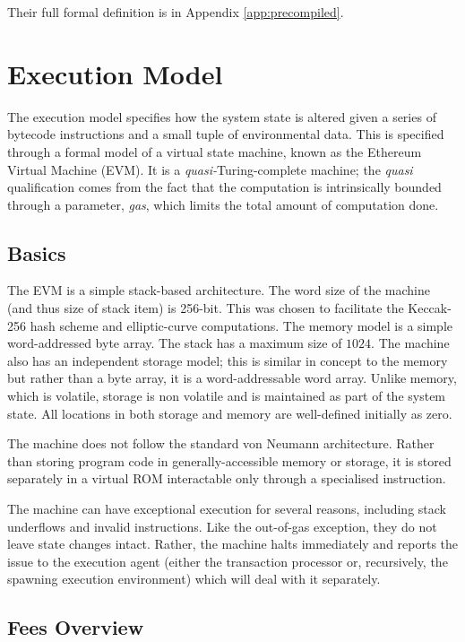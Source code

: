 \documentclass[9pt,oneside]{amsart}
\begin{document}
\begin{multicols}{2}
Their full formal definition is in Appendix \ref{app:precompiled}.

\section{Execution Model} \label{ch:model}

The execution model specifies how the system state is altered given a series of bytecode instructions and a small tuple of environmental data. This is specified through a formal model of a virtual state machine, known as the Ethereum Virtual Machine (EVM). It is a \textit{quasi-}Turing-complete machine; the \textit{quasi} qualification comes from the fact that the computation is intrinsically bounded through a parameter, \textit{gas}, which limits the total amount of computation done.

\subsection{Basics}

The EVM is a simple stack-based architecture. The word size of the machine (and thus size of stack item) is 256-bit. This was chosen to facilitate the Keccak-256 hash scheme and elliptic-curve computations. The memory model is a simple word-addressed byte array. The stack has a maximum size of $1024$. The machine also has an independent storage model; this is similar in concept to the memory but rather than a byte array, it is a word-addressable word array. Unlike memory, which is volatile, storage is non volatile and is maintained as part of the system state. All locations in both storage and memory are well-defined initially as zero.

The machine does not follow the standard von Neumann architecture. Rather than storing program code in generally-accessible memory or storage, it is stored separately in a virtual ROM interactable only through a specialised instruction.

The machine can have exceptional execution for several reasons, including stack underflows and invalid instructions. Like the out-of-gas exception, they do not leave state changes intact. Rather, the machine halts immediately and reports the issue to the execution agent (either the transaction processor or, recursively, the spawning execution environment) which will deal with it separately.

\subsection{Fees Overview}


\end{multicols}
\end{document}

